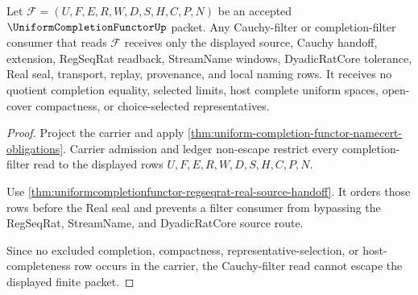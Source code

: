 \begin{theorem}
\label{thm:uniformcompletionfunctor-cauchy-filter-nonescape}
Let $\mathcal{F}=(U,F,E,R,W,D,S,H,C,P,N)$ be an accepted $\UniformCompletionFunctorUp$ packet. Any Cauchy-filter or completion-filter consumer that reads $\mathcal{F}$ receives only the displayed source, Cauchy handoff, extension, RegSeqRat readback, StreamName windows, DyadicRatCore tolerance, Real seal, transport, replay, provenance, and local naming rows. It receives no quotient completion equality, selected limits, host complete uniform spaces, open-cover compactness, or choice-selected representatives.
\end{theorem}
\begin{proof}
Project the carrier and apply \autoref{thm:uniform-completion-functor-namecert-obligations}. Carrier admission and ledger non-escape restrict every completion-filter read to the displayed rows $U,F,E,R,W,D,S,H,C,P,N$.

Use \autoref{thm:uniformcompletionfunctor-regseqrat-real-source-handoff}. It orders those rows before the Real seal and prevents a filter consumer from bypassing the RegSeqRat, StreamName, and DyadicRatCore source route.

Since no excluded completion, compactness, representative-selection, or host-completeness row occurs in the carrier, the Cauchy-filter read cannot escape the displayed finite packet.
\end{proof}

